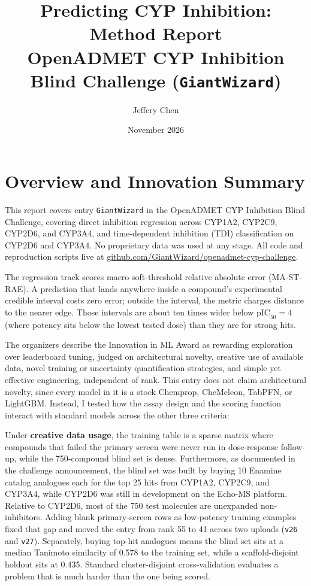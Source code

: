 \documentclass[11pt]{article}
\title{\textbf{Predicting CYP Inhibition: Method Report}\\
\large OpenADMET CYP Inhibition Blind Challenge (\texttt{GiantWizard})}
\author{Jeffery Chen}
\date{November 2026}
\begin{document}
\maketitle

\section{Overview and Innovation Summary}

This report covers entry \texttt{GiantWizard} in the OpenADMET CYP Inhibition Blind Challenge, covering direct inhibition regression across CYP1A2, CYP2C9, CYP2D6, and CYP3A4, and time-dependent inhibition (TDI) classification on CYP2D6 and CYP3A4. No proprietary data was used at any stage. All code and reproduction scripts live at \href{https://github.com/GiantWizard/openadmet-cyp-challenge}{github.com/GiantWizard/openadmet-cyp-challenge}.

The regression track scores macro soft-threshold relative absolute error (MA-ST-RAE). A prediction that lands anywhere inside a compound's experimental credible interval costs zero error; outside the interval, the metric charges distance to the nearer edge. Those intervals are about ten times wider below $\text{pIC}_{50} = 4$ (where potency sits below the lowest tested dose) than they are for strong hits. 

The organizers describe the Innovation in ML Award as rewarding exploration over leaderboard tuning, judged on architectural novelty, creative use of available data, novel training or uncertainty quantification strategies, and simple yet effective engineering, independent of rank. This entry does not claim architectural novelty, since every model in it is a stock Chemprop, CheMeleon, TabPFN, or LightGBM. Instead, I tested how the assay design and the scoring function interact with standard models across the other three criteria:

Under \textbf{creative data usage}, the training table is a sparse matrix where compounds that failed the primary screen were never run in dose-response follow-up, while the 750-compound blind set is dense. Furthermore, as documented in the challenge announcement, the blind set was built by buying 10 Enamine catalog analogues each for the top 25 hits from CYP1A2, CYP2C9, and CYP3A4, while CYP2D6 was still in development on the Echo-MS platform. Relative to CYP2D6, most of the 750 test molecules are unexpanded non-inhibitors. Adding blank primary-screen rows as low-potency training examples fixed that gap and moved the entry from rank 55 to 41 across two uploads (\texttt{v26} and \texttt{v27}). Separately, buying top-hit analogues means the blind set sits at a median Tanimoto similarity of 0.578 to the training set, while a scaffold-disjoint holdout sits at 0.435. Standard cluster-disjoint cross-validation evaluates a problem that is much harder than the one being scored.
\end{document}
